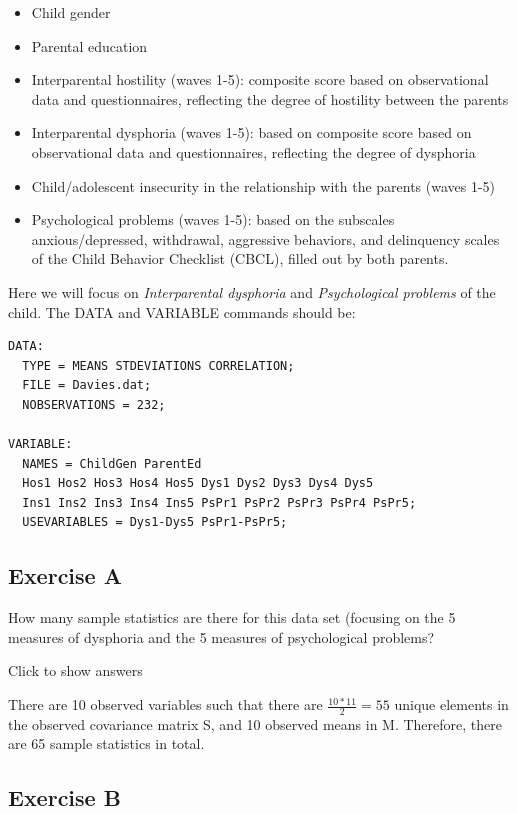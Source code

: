 \documentclass[
]{book}
\providecommand{\tightlist}{%
  \setlength{\itemsep}{0pt}\setlength{\parskip}{0pt}}
\begin{document}
\begin{itemize}
\tightlist
\item
  Child gender
\item
  Parental education
\item
  Interparental hostility (waves 1-5): composite score based on observational data and questionnaires, reflecting the degree of hostility between the parents
\item
  Interparental dysphoria (waves 1-5): based on composite score based on observational data and questionnaires, reflecting the degree of dysphoria
\item
  Child/adolescent insecurity in the relationship with the parents (waves 1-5)
\item
  Psychological problems (waves 1-5): based on the subscales anxious/depressed, withdrawal, aggressive behaviors, and delinquency scales of the Child Behavior Checklist (CBCL), filled out by both parents.
\end{itemize}

Here we will focus on \emph{Interparental dysphoria} and \emph{Psychological problems} of the child. The DATA and VARIABLE commands should be:

\begin{verbatim}
DATA: 
  TYPE = MEANS STDEVIATIONS CORRELATION;
  FILE = Davies.dat;
  NOBSERVATIONS = 232;

VARIABLE: 
  NAMES = ChildGen ParentEd
  Hos1 Hos2 Hos3 Hos4 Hos5 Dys1 Dys2 Dys3 Dys4 Dys5
  Ins1 Ins2 Ins3 Ins4 Ins5 PsPr1 PsPr2 PsPr3 PsPr4 PsPr5;
  USEVARIABLES = Dys1-Dys5 PsPr1-PsPr5;
\end{verbatim}

\hypertarget{exercise-a-1}{%
\subsection{Exercise A}\label{exercise-a-1}}

How many sample statistics are there for this data set (focusing on the 5 measures of dysphoria and the 5 measures of psychological problems?

Click to show answers

There are 10 observed variables such that there are \(\frac{10*11}{2} = 55\) unique elements in the observed covariance matrix S, and 10 observed means in M. Therefore, there are 65 sample statistics in total.

\hypertarget{exercise-b-1}{%
\subsection{Exercise B}\label{exercise-b-1}}
\end{document}
